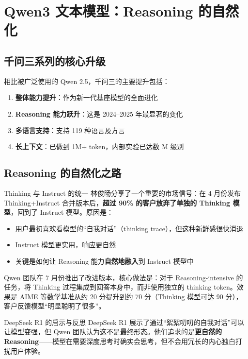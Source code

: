 \section{Qwen3 文本模型：Reasoning 的自然化}

\subsection{千问三系列的核心升级}

相比被广泛使用的 Qwen 2.5，千问三的主要提升包括：

\begin{enumerate}
    \item \textbf{整体能力提升}：作为新一代基座模型的全面进化
    \item \textbf{Reasoning 能力跃升}：这是 2024--2025 年最显著的变化
    \item \textbf{多语言支持}：支持 119 种语言及方言
    \item \textbf{长上下文}：已做到 1M+ token，内部实验已达数 M 级别
\end{enumerate}

\subsection{Reasoning 的自然化之路}

\begin{importantbox}{Thinking 与 Instruct 的统一}
林俊旸分享了一个重要的市场信号：在 4 月份发布 Thinking+Instruct 合并版本后，\textbf{超过 90\% 的客户放弃了单独的 Thinking 模型}，回到了 Instruct 模型。原因是：
\begin{itemize}
    \item 用户最初喜欢看模型的``自我对话''（thinking trace），但这种新鲜感很快消退
    \item Instruct 模型更实用，响应更自然
    \item 关键是如何让 Reasoning 能力\textbf{自然地融入}到 Instruct 模型中
\end{itemize}
\end{importantbox}

Qwen 团队在 7 月份推出了改进版本，核心做法是：对于 Reasoning-intensive 的任务，将 Thinking 过程集成到回答本身中，而非使用独立的 thinking token。效果是 AIME 等数学基准从约 20 分提升到约 70 分（Thinking 模型可达 90 分），客户反馈模型``明显聪明了很多''。

\begin{knowledgebox}{DeepSeek R1 的启示与反思}
DeepSeek R1 展示了通过``絮絮叨叨的自我对话''可以让模型变强，但 Qwen 团队认为这不是最终形态。他们追求的是\textbf{更自然的 Reasoning}——模型在需要深度思考时确实会思考，但不会用冗长的内心独白打扰用户体验。
\end{knowledgebox}


